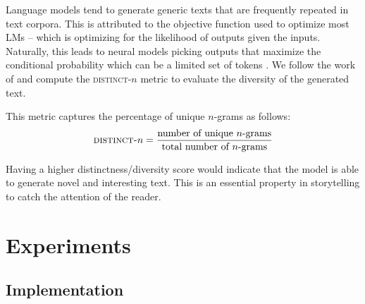 Language models tend to generate generic texts that are frequently repeated in text corpora. This is attributed to the objective function used to optimize most LMs -- which is optimizing for the likelihood of outputs given the inputs. Naturally, this leads to neural models picking outputs that maximize the conditional probability which can be a limited set of tokens \citep{li2015diversity}. We follow the work of \citep{li2015diversity} and compute the \textsc{distinct}-$n$ metric to evaluate the diversity of the generated text.

This metric captures the percentage of unique $n$-grams as follows:
\[ \textsc{distinct-}n = \frac{\text{number of unique $n$-grams}}{\text{total number of $n$-grams}} \]

Having a higher distinctness/diversity score would indicate that the model is able to generate novel and interesting text. This is an essential property in storytelling to catch the attention of the reader.







\section{Experiments}
\label{sec:experiments}

\subsection{Implementation}
\label{sec:implementation}

